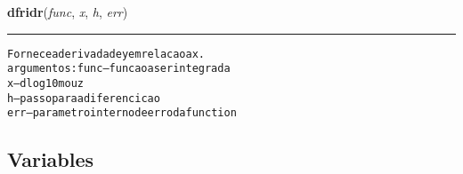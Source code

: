     \label{pycosmicstar:diferencial:dfridr}

    \vspace{0.5ex}

\hspace{.8\funcindent}\begin{boxedminipage}{\funcwidth}

    \raggedright \textbf{dfridr}(\textit{func}, \textit{x}, \textit{h}, \textit{err})

    \vspace{-1.5ex}

    \rule{\textwidth}{0.5\fboxrule}
\setlength{\parskip}{2ex}
\begin{alltt}
Fornece a derivada de y em relacao a x.
argumentos:  func --- funcao a ser integrada
             x    --- dlog10 m ou z
             h    --- passo para a diferencicao
             err  --- parametro interno de erro da function
\end{alltt}

\setlength{\parskip}{1ex}
    \end{boxedminipage}



  \subsection{Variables}

